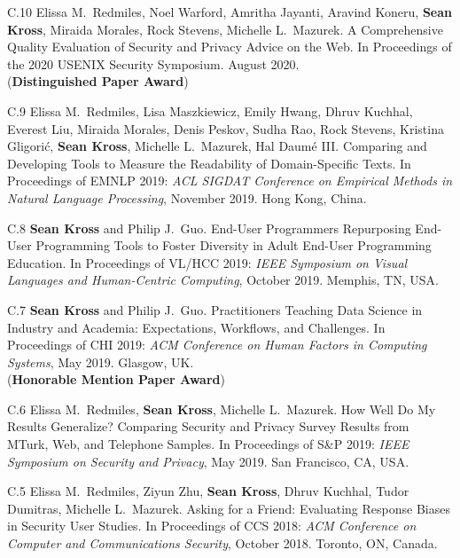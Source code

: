 \begin{bibenum}
\item[C.10] Elissa M.\ Redmiles, Noel Warford, Amritha Jayanti, Aravind Koneru,
\textbf{Sean Kross}, Miraida Morales, Rock Stevens, Michelle L.\ Mazurek.
A Comprehensive Quality Evaluation of Security and Privacy Advice on the Web. 
In Proceedings of the 2020 USENIX Security Symposium. August 2020.
\\ ({\textbf{Distinguished Paper Award}})

\item[C.9] Elissa M.\ Redmiles, Lisa Maszkiewicz, Emily Hwang, Dhruv Kuchhal,
Everest Liu, Miraida Morales, Denis Peskov, Sudha Rao, Rock Stevens, 
Kristina Gligorić, \textbf{Sean Kross}, Michelle L.\ Mazurek, Hal Daumé III.
Comparing and Developing Tools to Measure the Readability of Domain-Specific 
Texts. In Proceedings of EMNLP 2019: \emph{ACL SIGDAT Conference on Empirical 
Methods in Natural Language Processing}, November 2019. Hong Kong, China.

\item[C.8] \textbf{Sean Kross} and Philip J.\ Guo. End-User Programmers 
Repurposing End-User Programming Tools to Foster Diversity in Adult End-User 
Programming Education. In Proceedings of VL/HCC 2019: \emph{IEEE
Symposium on Visual Languages and Human-Centric Computing}, October 2019. 
Memphis, TN, USA.


\item[C.7] \textbf{Sean Kross} and Philip J.\ Guo. Practitioners Teaching Data 
Science in Industry and Academia: Expectations, Workflows, and Challenges.
In Proceedings of CHI 2019: \emph{ACM Conference on Human Factors in Computing 
Systems}, May 2019. Glasgow, UK. \\ ({\textbf{Honorable Mention Paper Award}})

\item[C.6] Elissa M.\ Redmiles, \textbf{Sean Kross}, Michelle L.\ Mazurek. 
How Well Do My Results Generalize? Comparing Security and Privacy Survey Results
from MTurk, Web, and Telephone Samples. In Proceedings of S\&P 2019: 
\emph{IEEE Symposium on Security and Privacy}, May 2019. San Francisco, CA, USA.

\item[C.5] Elissa M.\ Redmiles, Ziyun Zhu, \textbf{Sean Kross}, Dhruv Kuchhal,
Tudor Dumitras, Michelle L.\ Mazurek. Asking for a Friend: Evaluating Response 
Biases in Security User Studies. In Proceedings of CCS 2018: \emph{ACM 
Conference on Computer and Communications Security}, October 2018. Toronto, ON, 
Canada.


\end{bibenum}
